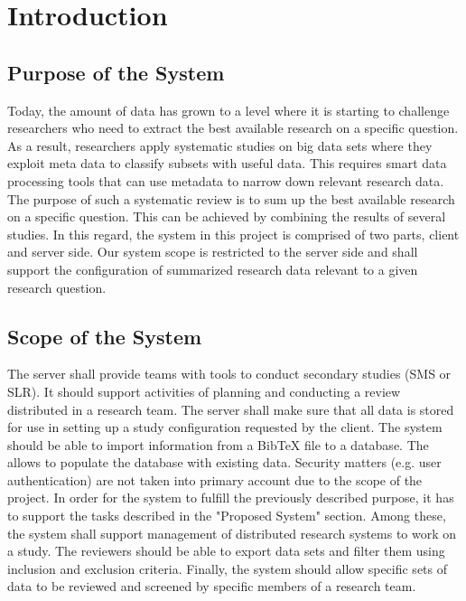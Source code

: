 
\section{Introduction}

\subsection{Purpose of the System}
Today, the amount of data has grown to a level where it is starting to challenge researchers who need to extract the best available research on a specific question. As a result, researchers apply systematic studies on big data sets where they exploit meta data to classify subsets with useful data. This requires smart data processing tools that can use metadata to narrow down relevant research data. The purpose of such a systematic review is to sum up the best available research on a specific question. This can be achieved by combining the results of several studies. In this regard, the system in this project is comprised of two parts, client and server side. Our system scope is restricted to the server side and shall support the configuration of summarized research data relevant to a given research question. 

\subsection{Scope of the System}
The server shall provide teams with tools to conduct secondary studies (SMS or SLR). It should support activities of planning and conducting a review distributed in a research team. The server shall make sure that all data is stored for use in setting up a study configuration requested by the client. The system should be able to import information from a BibTeX file to a database. The allows to populate the database with existing data. Security matters (e.g. user authentication) are not taken into primary account due to the scope of the project. 
In order for the system to fulfill the previously described purpose, it has to support the tasks described in the "Proposed System" section. Among these, the system shall support management of distributed research systems to work on a study. The reviewers should be able to export data sets and filter them using inclusion and exclusion criteria. Finally, the system should allow specific sets of data to be reviewed and screened by specific members of a research team. 

